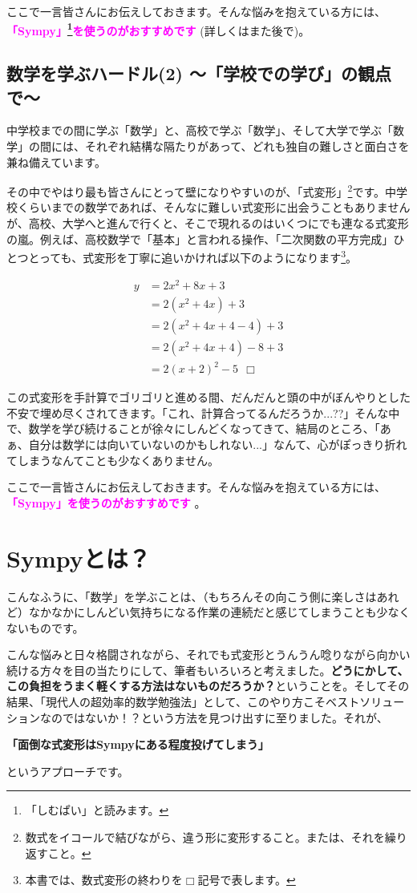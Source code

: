 \documentclass[10pt, a5paper,dvipdfmx]{jsbook}
\begin{document}
ここで一言皆さんにお伝えしておきます。そんな悩みを抱えている方には、
\textcolor{magenta}{
{\bf 「Sympy」\footnote{「しむぱい」と読みます。}を使うのがおすすめです}
}
(詳しくはまた後で)。

\subsection{数学を学ぶハードル(2) 〜「学校での学び」の観点で〜}
中学校までの間に学ぶ「数学」と、高校で学ぶ「数学」、そして大学で学ぶ「数学」の間には、それぞれ結構な隔たりがあって、どれも独自の難しさと面白さを兼ね備えています。

その中でやはり最も皆さんにとって壁になりやすいのが、「式変形」\footnote{数式をイコールで結びながら、違う形に変形すること。または、それを繰り返すこと。}です。中学校くらいまでの数学であれば、そんなに難しい式変形に出会うこともありませんが、高校、大学へと進んで行くと、そこで現れるのはいくつにでも連なる式変形の嵐。例えば、高校数学で「基本」と言われる操作、「二次関数の平方完成」ひとつとっても、式変形を丁寧に追いかければ以下のようになります\footnote{本書では、数式変形の終わりを$\Box$記号で表します。}。

\large
\begin{align*}
   y &= 2x^2 + 8x + 3\\
    &= 2(x^2+4x)+3\\
    &= 2(x^2+4x+4-4)+3\\
    &= 2(x^2+4x+4)-8+3\\
    &= 2(x+2)^2-5\ \ \Box
\end{align*}
\normalsize

この式変形を手計算でゴリゴリと進める間、だんだんと頭の中がぼんやりとした不安で埋め尽くされてきます。「これ、計算合ってるんだろうか...??」そんな中で、数学を学び続けることが徐々にしんどくなってきて、結局のところ、「あぁ、自分は数学には向いていないのかもしれない...」なんて、心がぽっきり折れてしまうなんてことも少なくありません。

ここで一言皆さんにお伝えしておきます。そんな悩みを抱えている方には、
\textcolor{magenta}{
{\bf 「Sympy」を使うのがおすすめです}
}
。
\section{Sympyとは？}
こんなふうに、「数学」を学ぶことは、（もちろんその向こう側に楽しさはあれど）なかなかにしんどい気持ちになる作業の連続だと感じてしまうことも少なくないものです。

こんな悩みと日々格闘されながら、それでも式変形とうんうん唸りながら向かい続ける方々を目の当たりにして、筆者もいろいろと考えました。{\bf どうにかして、この負担をうまく軽くする方法はないものだろうか？}ということを。そしてその結果、「現代人の超効率的数学勉強法」として、このやり方こそベストソリューションなのではないか！？という方法を見つけ出すに至りました。それが、
\large
\begin{center}
{\bf 「面倒な式変形はSympyにある程度投げてしまう」}
\end{center}
\normalsize
というアプローチです。
\end{document}
